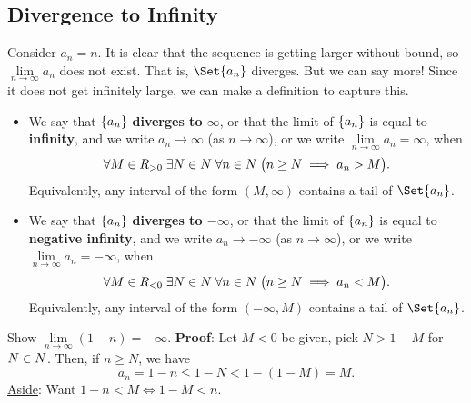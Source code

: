 \subsection{Divergence to Infinity}
Consider $ a_n=n $. It is clear that the sequence is getting larger without bound, so $ \lim\limits_{{n} \to {\infty}}a_n $
does not exist. That is, $ \Set{a_n} $ diverges. But we can say more! Since it does not get infinitely large,
we can make a definition to capture this.
\begin{Definition}{}{}
    \begin{itemize}
        \item We say that $ \{a_n\} $ \textbf{diverges to $ \infty $}, or that the limit of $ \{a_n\} $ is equal to \textbf{infinity}, and we write
              $ a_n\to \infty $ (as $ n\to\infty $), or we write $ \lim\limits_{{n} \to {\infty}}a_n=\infty $, when
              \[ \forall M\in\relax{R}_{>0}\; \exists N\in\relax{N}\;\forall n\in \relax{N}\; \bigl(n\ge N\implies a_n>M\bigr). \]
              Equivalently, any interval of the form $ (M,\infty) $ contains a tail of $ \Set{a_n} $.
        \item We say that $ \{a_n\} $ \textbf{diverges to $ -\infty $}, or that the limit of $ \{a_n\} $ is equal to
              \textbf{negative infinity}, and we write
              $ a_n\to -\infty $ (as $ n\to\infty $), or we write $ \lim\limits_{{n} \to {\infty}}a_n=-\infty $, when
              \[ \forall M\in\relax{R}_{<0}\; \exists N\in\relax{N}\;\forall n\in \relax{N}\; \bigl(n\ge N\implies a_n<M\bigr). \]
              Equivalently, any interval of the form $ (-\infty,M) $ contains a tail of $ \Set{a_n} $.
    \end{itemize}
\end{Definition}
\begin{Example}{}{}
    Show $ \lim\limits_{{n} \to {\infty}}(1-n)=-\infty $.
    \tcblower{}
    \textbf{Proof}: Let $ M<0 $ be given, pick $ N>1-M $ for $ N\in\relax{N} $. Then, if $ n\ge N $, we have
    \[ a_n=1-n\le 1-N<1-(1-M)=M. \]
    \underline{Aside}: Want $ 1-n<M\iff 1-M<n $.
\end{Example}